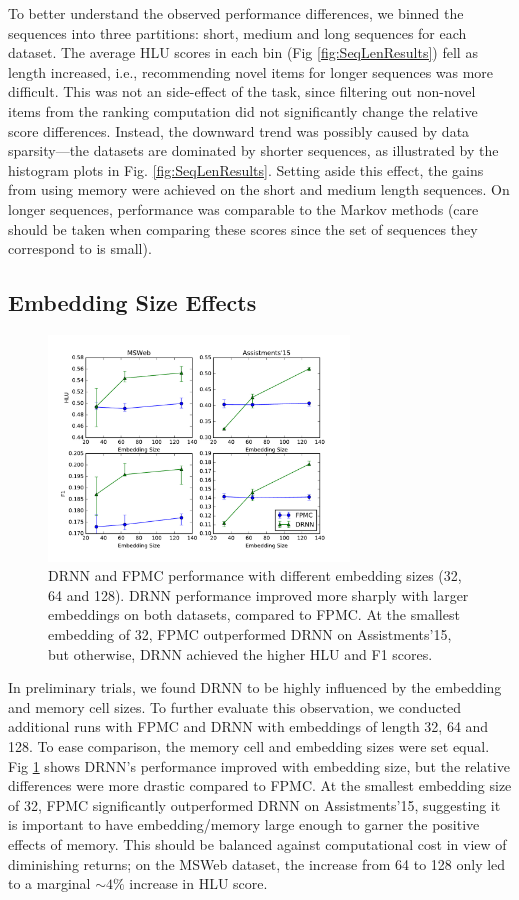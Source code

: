 \documentclass{sig-alternate-05-2015}
\begin{document}
To better understand the observed performance differences, we binned the sequences into three partitions: short, medium and long sequences for each dataset. The average HLU scores in each bin (Fig \ref{fig:SeqLenResults}) fell as length increased, i.e., recommending novel items for longer sequences was more difficult. This was not an side-effect of the task, since filtering out non-novel items from the ranking computation did not significantly change the relative score differences. Instead, the downward trend was possibly caused by data sparsity---the datasets are dominated by shorter sequences, as illustrated by the histogram plots in Fig. \ref{fig:SeqLenResults}. Setting aside this effect, the gains from using memory were achieved on the short and medium length sequences. On longer sequences, performance was comparable to the Markov methods (care should be taken when comparing these scores since the set of sequences they correspond to is small). 

\subsection{Embedding Size Effects}
\begin{figure}
\centering
\includegraphics[width=8cm]{images/EmbPerf}		
\caption{DRNN and FPMC performance with different embedding sizes (32, 64 and 128). DRNN performance improved more sharply with larger embeddings on both datasets, compared to FPMC. At the smallest embedding of 32, FPMC outperformed DRNN on Assistments'15, but otherwise, DRNN achieved the higher HLU and F1 scores.}
\label{fig:EmbResults}
\end{figure}
In preliminary trials, we found DRNN to be highly influenced by the embedding and memory cell sizes. To further evaluate this observation, we conducted additional runs with FPMC and DRNN with embeddings of length 32, 64 and 128. To ease comparison, the memory cell and embedding sizes were set equal. Fig \ref{fig:EmbResults} shows DRNN's performance improved with embedding size, but the relative differences were more drastic compared to FPMC. At the smallest embedding size of 32, FPMC significantly outperformed DRNN on Assistments'15, suggesting it is important to have embedding/memory large enough to garner the positive effects of memory. This should be balanced against computational cost in view of diminishing returns; on the MSWeb dataset, the increase from 64 to 128 only led to a marginal $\sim 4\%$ increase in HLU score.
\end{document}
